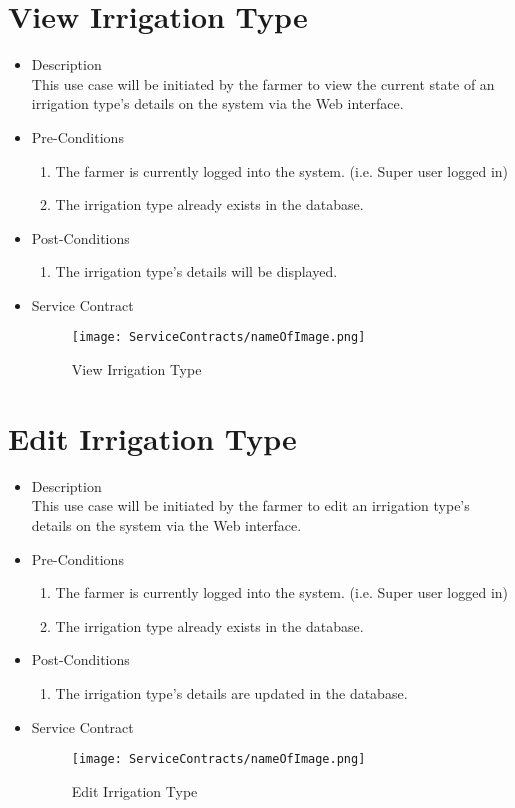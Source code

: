 \documentclass[11pt,fleqn]{book} %
\begin{document}
\section{View Irrigation Type}
\begin{itemize}
	\item Description\\
	This use case will be initiated by the farmer to view the current state of an irrigation type’s details on the system via the Web interface.
	\item Pre-Conditions
	\begin{enumerate}
		\item The farmer is currently logged into the system. (i.e. Super user logged in)
		\item The irrigation type already exists in the database.				
	\end{enumerate}
	\item Post-Conditions
	\begin{enumerate}
		\item The irrigation type’s details will be displayed.
	\end{enumerate}
	\item Service Contract
	\begin{figure}
		\texttt{[image: ServiceContracts/nameOfImage.png]}
		\caption{View Irrigation Type}
	\end{figure}
\end{itemize}

\section{Edit Irrigation Type}
\begin{itemize}
	\item Description\\
	This use case will be initiated by the farmer to edit an irrigation type’s details on the system via the Web interface.
	\item Pre-Conditions
	\begin{enumerate}
		\item The farmer is currently logged into the system. (i.e. Super user logged in)
		\item The irrigation type already exists in the database.					
	\end{enumerate}
	\item Post-Conditions
	\begin{enumerate}
		\item The irrigation type’s details are updated in the database.
	\end{enumerate}
	\item Service Contract
	\begin{figure}
		\texttt{[image: ServiceContracts/nameOfImage.png]}
		\caption{Edit Irrigation Type}
	\end{figure}
\end{itemize}
\end{document}
